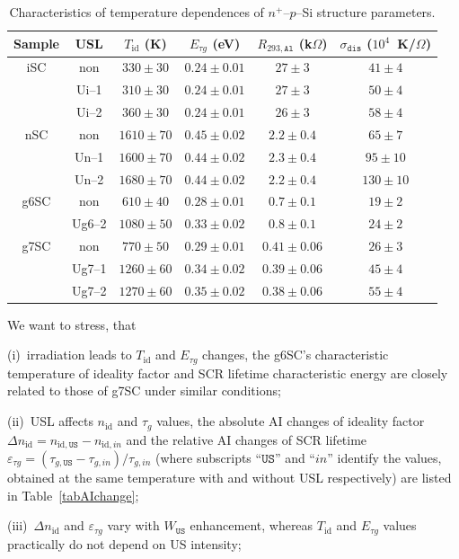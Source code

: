 \documentclass[aip,jap, amsmath,amssymb,reprint]{revtex4-1}
\begin{document}
\begin{table}
\caption{\label{tabTpar}Characteristics of temperature dependences of $n^+$--$p$--Si structure parameters.
}
\begin{ruledtabular}
\begin{tabular}{cccccc}
Sample&USL&$T_{\mathrm{id}}$ (K)&$E_{\tau g}$ (eV)&$R_{293,\mathtt{Al}}$ (k$\Omega$)&$\sigma_{\mathtt{dis}}$ ($10^4$~K/$\Omega$)\\
\hline
iSC&non&$330\pm30$&$0.24\pm0.01$&$27\pm3$&$41\pm4$\\
&Ui--1&$310\pm30$&$0.24\pm0.01$&$27\pm3$&$50\pm4$\\
&Ui--2&$360\pm30$&$0.24\pm0.01$&$26\pm3$&$58\pm4$\\
nSC&non&$1610\pm70$&$0.45\pm0.02$&$2.2\pm0.4$&$65\pm7$\\
&Un--1&$1600\pm70$&$0.44\pm0.02$&$2.3\pm0.4$&$95\pm10$\\
&Un--2&$1680\pm70$&$0.44\pm0.02$&$2.2\pm0.4$&$130\pm10$\\
g6SC&non&$610\pm40$&$0.28\pm0.01$&$0.7\pm0.1$&$19\pm2$\\
&Ug6--2&$1080\pm50$&$0.33\pm0.02$&$0.8\pm0.1$&$24\pm2$\\
g7SC&non&$770\pm50$&$0.29\pm0.01$&$0.41\pm0.06$&$26\pm3$\\
&Ug7--1&$1260\pm60$&$0.34\pm0.02$&$0.39\pm0.06$&$45\pm4$\\
&Ug7--2&$1270\pm60$&$0.35\pm0.02$&$0.38\pm0.06$&$55\pm4$\\
\end{tabular}
\end{ruledtabular}
\end{table}

We want to stress, that

\noindent
(i)~irradiation leads to $T_{\mathrm{id}}$ and $E_{\tau g}$ changes, the g6SC's characteristic temperature of ideality factor and SCR lifetime characteristic energy are closely related to those of g7SC under similar conditions;

\noindent
(ii)~USL affects $n_{\mathrm{id}}$ and $\tau_g$ values, 
the absolute AI changes of ideality factor $\Delta n_{\mathrm{id}}=n_{\mathrm{id},\mathtt{US}}-n_{\mathrm{id},in}$ and
the relative AI changes of SCR lifetime $\varepsilon_{\tau g}=(\tau_{g,\mathtt{US}}-\tau_{g,in})/\tau_{g,in}$
(where subscripts ``$\mathtt{US}$'' and ``$in$'' identify the values,
obtained at the same temperature with and without USL respectively)
are listed in Table~\ref{tabAIchange};

\noindent
(iii)~$\Delta n_{\mathrm{id}}$ and $\varepsilon_{\tau g}$ vary with $W_{\mathtt{US}}$ enhancement, whereas $T_{\mathrm{id}}$ and $E_{\tau g}$ values practically do not depend on US intensity;
\end{document}
